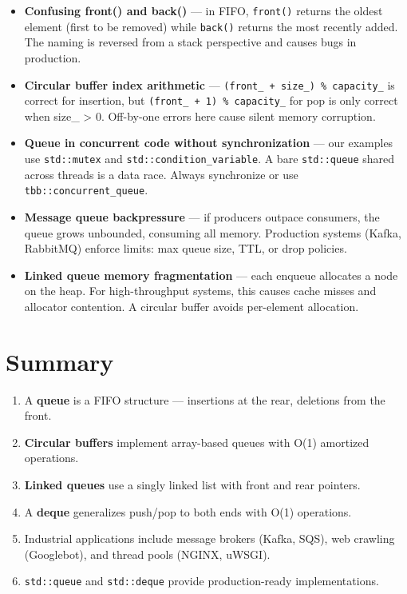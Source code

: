\begin{itemize}
\item \textbf{Confusing front() and back()} — in FIFO, \texttt{front()} returns the oldest element (first to be removed) while \texttt{back()} returns the most recently added. The naming is reversed from a stack perspective and causes bugs in production.
\item \textbf{Circular buffer index arithmetic} — \texttt{(front\_ + size\_) \% capacity\_} is correct for insertion, but \texttt{(front\_ + 1) \% capacity\_} for pop is only correct when size\_ > 0. Off-by-one errors here cause silent memory corruption.
\item \textbf{Queue in concurrent code without synchronization} — our examples use \texttt{std::mutex} and \texttt{std::condition\_variable}. A bare \texttt{std::queue} shared across threads is a data race. Always synchronize or use \texttt{tbb::concurrent\_queue}.
\item \textbf{Message queue backpressure} — if producers outpace consumers, the queue grows unbounded, consuming all memory. Production systems (Kafka, RabbitMQ) enforce limits: max queue size, TTL, or drop policies.
\item \textbf{Linked queue memory fragmentation} — each enqueue allocates a node on the heap. For high-throughput systems, this causes cache misses and allocator contention. A circular buffer avoids per-element allocation.
\end{itemize}

\section{Summary}

\begin{enumerate}
\item A \textbf{queue} is a FIFO structure — insertions at the rear, deletions from the front.
\item \textbf{Circular buffers} implement array-based queues with O(1) amortized operations.
\item \textbf{Linked queues} use a singly linked list with front and rear pointers.
\item A \textbf{deque} generalizes push/pop to both ends with O(1) operations.
\item Industrial applications include message brokers (Kafka, SQS), web crawling (Googlebot), and thread pools (NGINX, uWSGI).
\item \texttt{std::queue} and \texttt{std::deque} provide production-ready implementations.
\end{enumerate}


